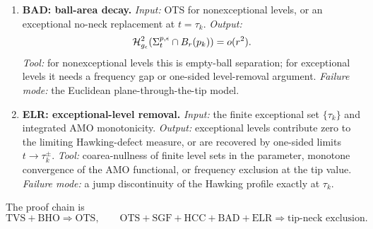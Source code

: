 \begin{remark}
\begin{enumerate}
    \item \textbf{BAD: ball-area decay.}
    \emph{Input:} OTS for nonexceptional levels, or an exceptional no-neck
    replacement at \(t=\tau_k\).
    \emph{Output:}
    \[
        \mathcal H^2_{g_{\epsilon}}(\Sigma_t^{p,\epsilon}\cap B_r(p_k))=o(r^2).
    \]
    \emph{Tool:} for nonexceptional levels this is empty-ball separation; for
    exceptional levels it needs a frequency gap or one-sided level-removal
    argument.
    \emph{Failure mode:} the Euclidean plane-through-the-tip model.

    \item \textbf{ELR: exceptional-level removal.}
    \emph{Input:} the finite exceptional set \(\{\tau_k\}\) and integrated AMO
    monotonicity.
    \emph{Output:} exceptional levels contribute zero to the limiting
    Hawking-defect measure, or are recovered by one-sided limits
    \(t\to\tau_k^\pm\).
    \emph{Tool:} coarea-nullness of finite level sets in the parameter,
    monotone convergence of the AMO functional, or frequency exclusion at the
    tip value.
    \emph{Failure mode:} a jump discontinuity of the Hawking profile exactly at
    \(\tau_k\).
\end{enumerate}
The proof chain is
\[
    \text{TVS}+\text{BHO}\Rightarrow\text{OTS},\qquad
    \text{OTS}+\text{SGF}+\text{HCC}+\text{BAD}+\text{ELR}
    \Rightarrow
    \text{tip-neck exclusion}.
\]
\end{remark}

